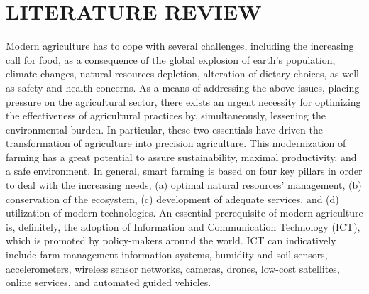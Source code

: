 \chapter{LITERATURE REVIEW}
Modern agriculture has to cope with several challenges, including the increasing call for food, as a consequence of the global explosion of earth’s population, climate changes, natural resources depletion, alteration of dietary choices, as well as safety and health concerns. As a means of addressing the above issues, placing pressure on the agricultural sector, there exists an urgent necessity for optimizing the effectiveness of agricultural practices by, simultaneously, lessening the environmental burden. In particular, these two essentials have driven the transformation of agriculture into precision agriculture. This modernization of farming has a great potential to assure sustainability, maximal productivity, and a safe environment. In general, smart farming is based on four key pillars in order to deal with the increasing needs; (a) optimal natural resources’ management, (b) conservation of the ecosystem, (c) development of adequate services, and (d) utilization of modern technologies. An essential prerequisite of modern agriculture is, definitely, the adoption of Information and Communication Technology (ICT), which is promoted by policy-makers around the world. ICT can indicatively include farm management information systems, humidity and soil sensors, accelerometers, wireless sensor networks, cameras, drones, low-cost satellites, online services, and automated guided vehicles.\newline \citep{benosMachineLearningAgriculture2021}


